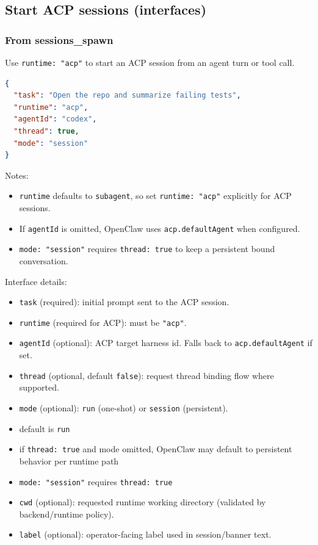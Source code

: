 \subsection{Start ACP sessions (interfaces)}


\subsubsection{From sessions\_spawn}


Use \texttt{runtime: "acp"} to start an ACP session from an agent turn or tool call.

\begin{lstlisting}[language=json]
{
  "task": "Open the repo and summarize failing tests",
  "runtime": "acp",
  "agentId": "codex",
  "thread": true,
  "mode": "session"
}
\end{lstlisting}


Notes:

\begin{itemize}
  \item \texttt{runtime} defaults to \texttt{subagent}, so set \texttt{runtime: "acp"} explicitly for ACP sessions.
  \item If \texttt{agentId} is omitted, OpenClaw uses \texttt{acp.defaultAgent} when configured.
  \item \texttt{mode: "session"} requires \texttt{thread: true} to keep a persistent bound conversation.
\end{itemize}


Interface details:

\begin{itemize}
  \item \texttt{task} (required): initial prompt sent to the ACP session.
  \item \texttt{runtime} (required for ACP): must be \texttt{"acp"}.
  \item \texttt{agentId} (optional): ACP target harness id. Falls back to \texttt{acp.defaultAgent} if set.
  \item \texttt{thread} (optional, default \texttt{false}): request thread binding flow where supported.
  \item \texttt{mode} (optional): \texttt{run} (one-shot) or \texttt{session} (persistent).
  \item default is \texttt{run}
  \item if \texttt{thread: true} and mode omitted, OpenClaw may default to persistent behavior per runtime path
  \item \texttt{mode: "session"} requires \texttt{thread: true}
  \item \texttt{cwd} (optional): requested runtime working directory (validated by backend/runtime policy).
  \item \texttt{label} (optional): operator-facing label used in session/banner text.
\end{itemize}


